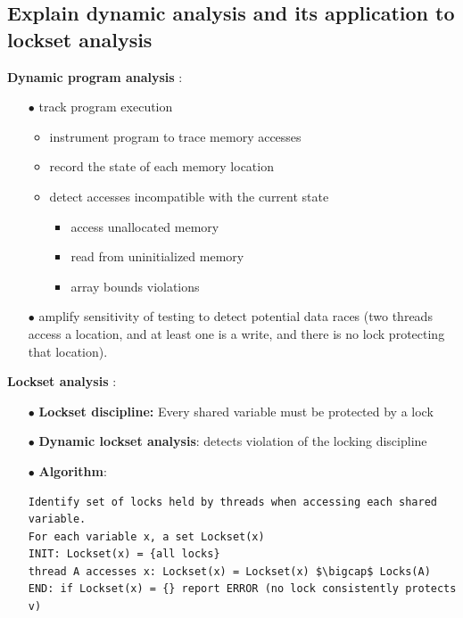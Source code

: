 \documentclass{article}
\begin{document}
\subsection{Explain dynamic analysis and its application to lockset analysis}
\noindent
\textbf{Dynamic program analysis} :
\begin{itemize}
    \item [$\bullet$] track program execution
    \begin{itemize}
        \item instrument program to trace memory accesses
        \item record the state of each memory location
        \item detect accesses incompatible with the current state
        \begin{itemize}
            \item access unallocated memory
            \item read from uninitialized memory
            \item array bounds violations
        \end{itemize}
    \end{itemize}
    \item [$\bullet$] amplify sensitivity of testing to detect potential data races (two threads access a location, and at least one is a write, and there is no lock protecting that location).
\end{itemize}
\vspace{1em}
\textbf{Lockset analysis} :
\begin{itemize}
    \item [$\bullet$]\textbf{Lockset discipline:} Every shared variable must be protected by a lock
    \item [$\bullet$]\textbf{Dynamic lockset analysis}: detects violation of the locking discipline
    \item [$\bullet$]\textbf{Algorithm}:
    \begin{lstlisting}
Identify set of locks held by threads when accessing each shared variable.
For each variable x, a set Lockset(x)
INIT: Lockset(x) = {all locks}
thread A accesses x: Lockset(x) = Lockset(x) $\bigcap$ Locks(A)
END: if Lockset(x) = {} report ERROR (no lock consistently protects v)
    \end{lstlisting}
\end{itemize}
\end{document}
